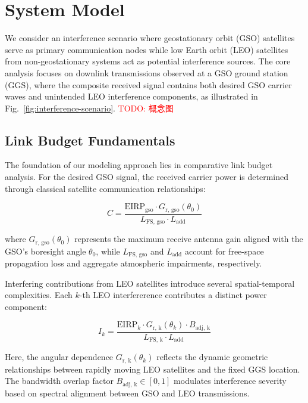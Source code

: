 \documentclass[12pt]{article}
\newcommand{\todo}[1]{\textcolor{red}{TODO: #1}}
\begin{document}
\section{System Model}
\label{sec:system_model}

We consider an interference scenario where geostationary orbit (GSO) satellites serve as primary communication nodes while low Earth orbit (LEO) satellites from non-geostationary systems act as potential interference sources. The core analysis focuses on downlink transmissions observed at a GSO ground station (GGS), where the composite received signal contains both desired GSO carrier waves and unintended LEO interference components, as illustrated in Fig.~\ref{fig:interference-scenario}. \todo{概念图}

\subsection{Link Budget Fundamentals}
The foundation of our modeling approach lies in comparative link budget analysis. For the desired GSO signal, the received carrier power is determined through classical satellite communication relationships:

\begin{equation}
    C = \frac{\text{EIRP}_{\text{gso}} \cdot G_{\text{r, gso}}(\theta_0)}{L_{\text{FS, gso}} \cdot L_{\text{add}}}
\end{equation}

where $G_{\text{r, gso}}(\theta_0)$ represents the maximum receive antenna gain aligned with the GSO's boresight angle $\theta_0$, while $L_{\text{FS, gso}}$ and $L_{\text{add}}$ account for free-space propagation loss and aggregate atmospheric impairments, respectively.

Interfering contributions from LEO satellites introduce several spatial-temporal complexities. Each $k$-th LEO interfererence contributes a distinct power component:

\begin{equation}
    I_k = \frac{\text{EIRP}_k \cdot G_{\text{r, k}}(\theta_k) \cdot B_{\text{adj, k}}}{L_{\text{FS, k}} \cdot L_{\text{add}}}
\end{equation}

Here, the angular dependence $G_{\text{r, k}}(\theta_k)$ reflects the dynamic geometric relationships between rapidly moving LEO satellites and the fixed GGS location. The bandwidth overlap factor $B_{\text{adj, k}} \in [0,1]$ modulates interference severity based on spectral alignment between GSO and LEO transmissions.
\end{document}
